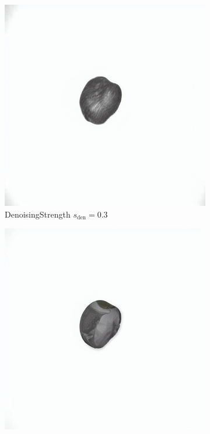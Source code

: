 \documentclass[12pt,DIV14,BCOR12mm,a4paper,footinclude=false,headinclude,parskip=half-,twoside,openright,cleardoublepage=empty,toc=index,bibliography=totoc,listof=totoc]{scrreprt}
\numberwithin{equation}{chapter}
\begin{document}
\begin{figure}
    \begin{subfigure}{0.23\textwidth} %
        \centering
        \includegraphics[width=\linewidth]{../media/image_0.3.png} %
        \caption{Denoising\hspace{0.2em}Strength $s_{\text{den}} = 0.3$}
    \end{subfigure}
    \begin{subfigure}{0.23\textwidth} %
        \centering
        \includegraphics[width=\linewidth]{../media/image_0.5.png} %

\end{subfigure}
\end{figure}
\end{document}
